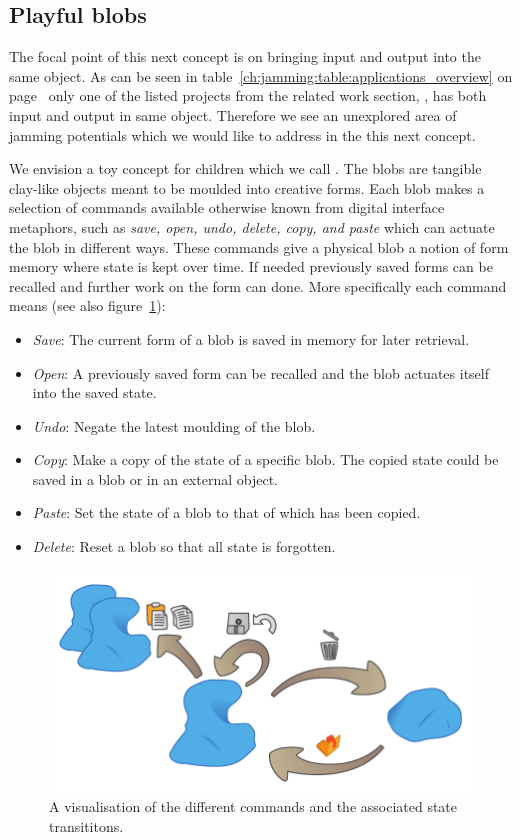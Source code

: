 \subsection{Playful blobs}
\label{ch:jamming:concepts:playful_blobs}

The focal point of this next concept is on bringing input and output into the same object.
As can be seen in table~\ref{ch:jamming:table:applications_overview} on page~\pageref{ch:jamming:table:applications_overview} only one of the listed projects from the related work section, , has both input and output in same object.
Therefore we see an unexplored area of jamming potentials which we would like to address in the this next concept.

We envision a toy concept for children which we call .
The blobs are tangible clay-like objects meant to be moulded into creative forms.
Each blob makes a selection of commands available otherwise known from digital interface metaphors, such as \emph{save, open, undo, delete, copy, and paste} which can actuate the blob in different ways.
These commands give a physical blob a notion of form memory where state is kept over time.
If needed previously saved forms can be recalled and further work on the form can done.
More specifically each command means (see also figure~\ref{fig:ch:jamming:concepts:blobs:states}):
\begin{itemize}
	\item{\emph{Save}: The current form of a blob is saved in memory for later retrieval.}
	\item{\emph{Open}: A previously saved form can be recalled and the blob actuates itself into the saved state.}
	\item{\emph{Undo}: Negate the latest moulding of the blob.}
	\item{\emph{Copy}: Make a copy of the state of a specific blob. The copied state could be saved in a blob or in an external object.}
	\item{\emph{Paste}: Set the state of a blob to that of which has been copied.} 
	\item{\emph{Delete}: Reset a blob so that all state is forgotten.} 
\end{itemize}

\begin{figure}[h]
  \centering
  \includegraphics[width=.9\textwidth]{figures/jamming/concepts/blobs/state-transitions.pdf}
  \caption{A visualisation of the different commands and the associated state transititons.}
  \label{fig:ch:jamming:concepts:blobs:states}
\end{figure}

